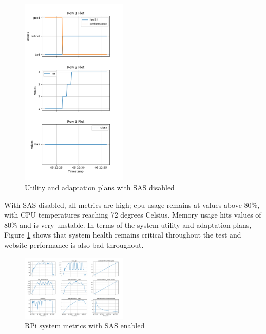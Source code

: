 \documentclass[conference]{IEEEtran}
\begin{document}
\begin{figure}[H]
    \centering
    \includegraphics[width=0.45\textwidth]{./media/before_SAS_utility_and_plans.png}
    \caption{Utility and adaptation plans with SAS disabled}
    \label{fig:before_SAS_utility_and_plans}
\end{figure}

With SAS disabled, all metrics are high; cpu usage remains at values above 80\%, with CPU temperatures reaching 72 degrees Celsius. Memory usage hits values of 80\% and is very unstable. In terms of the system utility and adaptation plans, Figure \ref{fig:before_SAS_utility_and_plans} shows that system health remains critical throughout the test and website performance is also bad throughout.

\begin{figure}[H]
    \centering
    \includegraphics[width=0.45\textwidth]{./media/after_SAS_metrics.png}
    \caption{RPi system metrics with SAS enabled}
    \label{fig:after_SAS_metrics}
\end{figure}
\end{document}
